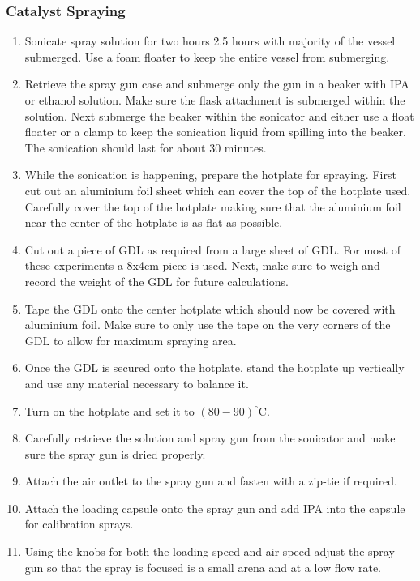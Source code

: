\documentclass{article}
\begin{document}
		\subsubsection{Catalyst Spraying}
			\begin{enumerate}
		\item Sonicate spray solution for two hours 2.5 hours with majority of the vessel submerged. Use a foam floater to keep the entire vessel from submerging.
        \item Retrieve the spray gun case and submerge only the gun in a beaker with IPA or ethanol solution. Make sure the flask attachment is submerged within the solution. Next submerge the beaker within the sonicator and either use a float floater or a clamp to keep the sonication liquid from spilling into the beaker. The sonication should last for about 30 minutes.
        \item While the sonication is happening, prepare the hotplate for spraying. First cut out an aluminium foil sheet which can cover the top of the hotplate used. Carefully cover the top of the hotplate making sure that the aluminium foil near the center of the hotplate is as flat as possible.
        \item Cut out a piece of GDL as required from a large sheet of GDL. For most of these experiments a 8x4cm piece is used. Next, make sure to weigh and record the weight of the GDL for future calculations.
        \item Tape the GDL onto the center hotplate which should now be covered with aluminium foil. Make sure to only use the tape on the very corners of the GDL to allow for maximum spraying area.
        \item Once the GDL is secured onto the hotplate, stand the hotplate up vertically and use any material necessary to balance it.
        \item Turn on the hotplate and set it to $(80-90)^{\circ}$C.
        \item Carefully retrieve the solution and spray gun from the sonicator and make sure the spray gun is dried properly.
        \item Attach the air outlet to the spray gun and fasten with a zip-tie if required.
        \item Attach the loading capsule onto the spray gun and add IPA into the capsule for calibration sprays.
        \item Using the knobs for both the loading speed and air speed adjust the spray gun so that the spray is focused is a small arena and at a low flow rate.

\end{enumerate}
\end{document}
